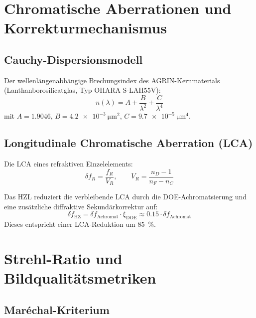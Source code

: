 ﻿\documentclass[12pt,a4paper]{article}
\theoremstyle{definition}
\newcommand{\HZ}{\mathrm{HZ}}
\begin{document}
	\section{Chromatische Aberrationen und Korrekturmechanismus}
	
	\subsection{Cauchy-Dispersionsmodell}
	
	Der wellenlängenabhängige Brechungsindex des AGRIN-Kernmaterials
	(Lanthanborosilicatglas, Typ OHARA S-LAH55V):
	\begin{equation}
		n(\lambda) = A + \frac{B}{\lambda^2} + \frac{C}{\lambda^4}
		\label{eq:cauchy}
	\end{equation}
	mit $A = 1.9046$, $B = \SI{4.2e-3}{\micro\metre^2}$,
	$C = \SI{9.7e-5}{\micro\metre^4}$.
	
	\subsection{Longitudinale Chromatische Aberration (LCA)}
	
	Die LCA eines refraktiven Einzelelements:
	\begin{equation}
		\delta f_R = \frac{f_R}{V_R},
		\qquad
		V_R = \frac{n_D - 1}{n_F - n_C}
		\label{eq:lca}
	\end{equation}
	
	Das HZL reduziert die verbleibende LCA durch die DOE-Achromatsierung
	und eine zusätzliche diffraktive Sekundärkorrektur auf:
	\begin{equation}
		\delta f_\HZ = \delta f_\mathrm{Achromat}\cdot\xi_\mathrm{DOE}
		\approx 0.15\cdot\delta f_\mathrm{Achromat}
		\label{eq:lca_hz}
	\end{equation}
	Dieses entspricht einer LCA-Reduktion um \SI{85}{\percent}.
	
	\section{Strehl-Ratio und Bildqualitätsmetriken}
	
	\subsection{Maréchal-Kriterium}
	
\end{document}
